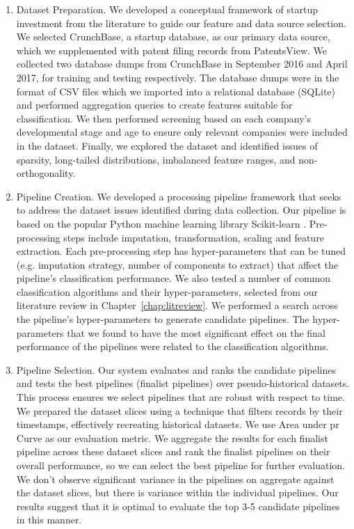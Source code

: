 \documentclass[../thesis/thesis.tex]{subfiles}
\begin{document}
\begin{enumerate}

\item Dataset Preparation. We developed a conceptual framework of startup investment from the literature to guide our feature and data source selection. We selected CrunchBase, a startup database, as our primary data source, which we supplemented with patent filing records from PatentsView. We collected two database dumps from CrunchBase in September 2016 and April 2017, for training and testing respectively. The database dumps were in the format of CSV files which we imported into a relational database (SQLite) and performed aggregation queries to create features suitable for classification. We then performed screening based on each company's developmental stage and age to ensure only relevant companies were included in the dataset. Finally, we explored the dataset and identified issues of sparsity, long-tailed distributions, imbalanced feature ranges, and non-orthogonality.

\item Pipeline Creation. We developed a processing pipeline framework that seeks to address the dataset issues identified during data collection. Our pipeline is based on the popular Python machine learning library Scikit-learn \cite{pedregosa2011}. Pre-processing steps include imputation, transformation, scaling and feature extraction. Each pre-processing step has hyper-parameters that can be tuned (e.g. imputation strategy, number of components to extract) that affect the pipeline's classification performance. We also tested a number of common classification algorithms and their hyper-parameters, selected from our literature review in Chapter~\ref{chap:litreview}. We performed a search across the pipeline's hyper-parameters to generate candidate pipelines. The hyper-parameters that we found to have the most significant effect on the final performance of the pipelines were related to the classification algorithms.

\item Pipeline Selection. Our system evaluates and ranks the candidate pipelines and tests the best pipelines (finalist pipelines) over pseudo-historical datasets. This process ensures we select pipelines that are robust with respect to time. We prepared the dataset slices using a technique that filters records by their timestamps, effectively recreating historical datasets. We use Area under \gls{pr} Curve as our evaluation metric. We aggregate the results for each finalist pipeline across these dataset slices and rank the finalist pipelines on their overall performance, so we can select the best pipeline for further evaluation. We don't observe significant variance in the pipelines on aggregate against the dataset slices, but there is variance within the individual pipelines. Our results suggest that it is optimal to evaluate the top 3-5 candidate pipelines in this manner.


\end{enumerate}
\end{document}
